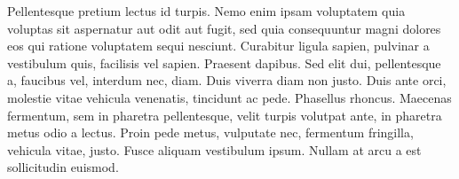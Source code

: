 Pellentesque pretium lectus id turpis. Nemo enim ipsam voluptatem quia voluptas sit aspernatur aut odit aut fugit, sed quia consequuntur magni dolores eos qui ratione voluptatem sequi nesciunt. Curabitur ligula sapien, pulvinar a vestibulum quis, facilisis vel sapien. Praesent dapibus. Sed elit dui, pellentesque a, faucibus vel, interdum nec, diam. Duis viverra diam non justo. Duis ante orci, molestie vitae vehicula venenatis, tincidunt ac pede. Phasellus rhoncus. Maecenas fermentum, sem in pharetra pellentesque, velit turpis volutpat ante, in pharetra metus odio a lectus. Proin pede metus, vulputate nec, fermentum fringilla, vehicula vitae, justo. Fusce aliquam vestibulum ipsum. Nullam at arcu a est sollicitudin euismod.

%
%
%
